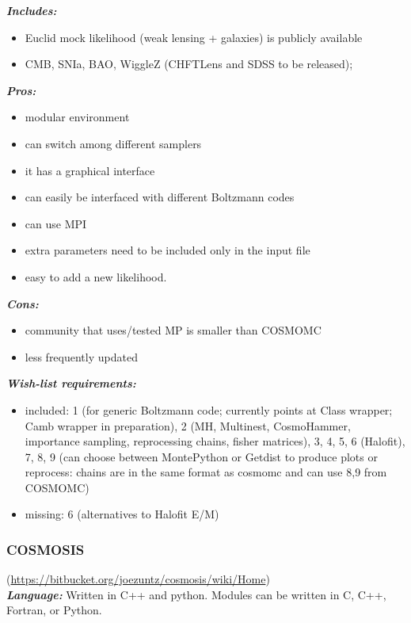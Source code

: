 {\it \bf Includes:}
\begin{itemize}
 \item Euclid mock likelihood (weak lensing + galaxies) is publicly available
 \item CMB, SNIa, BAO, WiggleZ (CHFTLens and SDSS to be released); 
\end{itemize}

{\it \bf Pros: }
\begin{itemize}
 \item modular environment
 \item can switch among different samplers
 \item it has a graphical interface
 \item can easily be interfaced with different Boltzmann codes
 \item can use MPI
 \item extra parameters need to be included only in the input file
 \item easy to add a new likelihood.
\end{itemize}

{\it \bf Cons:} 
\begin{itemize}
 \item community that uses/tested MP is smaller than COSMOMC
 \item less frequently updated 
\end{itemize}

{\it \bf Wish-list requirements: }
\begin{itemize}
 \item included: 1 (for generic Boltzmann code; currently points at Class wrapper; Camb wrapper in preparation), 2 (MH, Multinest, CosmoHammer, importance sampling, reprocessing chains, fisher matrices), 3, 4, 5, 6 (Halofit), 7, 8, 9 (can choose between MontePython or Getdist to produce plots or reprocess: chains are in the same format as cosmomc and can use 8,9 from COSMOMC) 
 \item missing: 6 (alternatives to Halofit E/M) 
\end{itemize}

\newpage
\subsubsection{COSMOSIS}
(\url{https://bitbucket.org/joezuntz/cosmosis/wiki/Home})\\

{\it \bf Language:} Written in C++ and python. Modules can be written in C, C++, Fortran, or Python.\\

